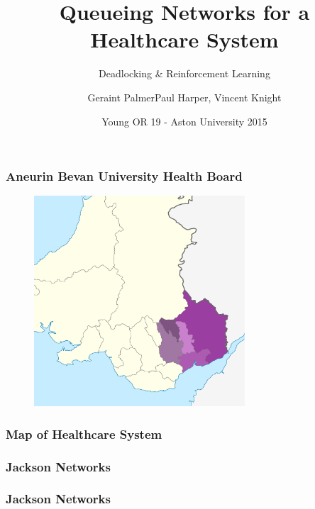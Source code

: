 \documentclass[xcolor={table}]{beamer}
\title
{Queueing Networks for a Healthcare System}
\subtitle
{Deadlocking \& Reinforcement Learning}
\author{Geraint Palmer\newline \scriptsize{Paul Harper, Vincent Knight}}
\date{Young OR 19 - Aston University 2015}
\begin{document}
\frame{\titlepage}


\begin{frame}
\frametitle{Aneurin Bevan University Health Board}
\begin{figure}
\includegraphics[width=0.7\textwidth]{Aneurin_Bevan}
\end{figure}
\end{frame}


%     

%     


\begin{frame}
\frametitle{Map of Healthcare System}
\begin{figure}

\end{figure}
\end{frame}


\begin{frame}
  \frametitle{Jackson Networks}
  \begin{figure}
  
  \end{figure}
\end{frame}
\begin{frame}
  \frametitle{Jackson Networks}
  \begin{figure}
  
  \end{figure}
\end{frame}
\end{document}
